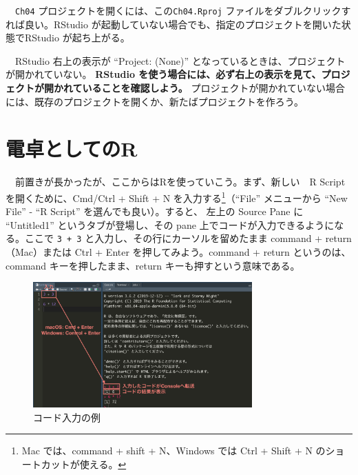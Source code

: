 \documentclass[
  a4paper,
  pandoc,
  ja=standard,
  jafont=haranoaji]{bxjsbook}
\begin{document}
　\texttt{Ch04} プロジェクトを開くには、この\texttt{Ch04.Rproj}
ファイルをダブルクリックすれば良い。RStudio
が起動していない場合でも、指定のプロジェクトを開いた状態でRStudio
が起ち上がる。

　RStudio 右上の表示が ``Project: (None)''
となっているときは、プロジェクトが開かれていない。 \textbf{RStudio
を使う場合には、必ず右上の表示を見て、プロジェクトが開かれていることを確認しよう。}
プロジェクトが開かれていない場合には、既存のプロジェクトを開くか、新たばプロジェクトを作ろう。

\hypertarget{sec-rbasic_calc}{%
\section{電卓としてのR}\label{sec-rbasic_calc}}

　前置きが長かったが、ここからはRを使っていこう。まず、新しい　R Script
を開くために、Cmd/Ctrl + Shift + N を入力する\footnote{Mac では、command
  + shift + N、Windows では Ctrl + Shift + N のショートカットが使える。}（``File''
メニューから ``New File'' - ``R Script'' を選んでも良い）。すると、
左上の Source Pane に ``Untitled1'' というタブが登場し、その pane
上でコードが入力できるようになる。ここで \texttt{3\ +\ 3}
と入力し、その行にカーソルを留めたまま command + return（Mac）または
Ctrl + Enter を押してみよう。command + return というのは、command
キーを押したまま、return キーも押すという意味である。

\begin{figure}

{\centering \includegraphics[width=0.75\textwidth,height=\textheight]{./Figs/Rbasic/InputCode1.png}

}

\caption{\label{fig-rbasic_inputcode1}コード入力の例}

\end{figure}
\end{document}
